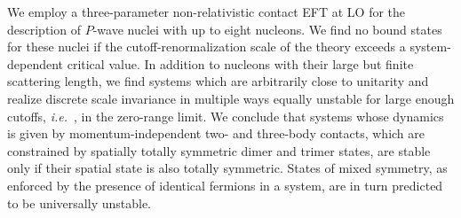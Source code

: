 \documentclass[preprint,12pt]{elsarticle}
\newcommand{\ie}{\textit{i.e.}~}
\begin{document}
We employ a three-parameter non-relativistic contact EFT at LO for the description of $P$-wave nuclei with up to eight nucleons.
We find no bound states for these nuclei if the cutoff-renormalization scale of the theory exceeds a system-dependent critical value.
In addition to nucleons with their large but finite scattering length, we find systems which are arbitrarily close to unitarity and realize
discrete scale invariance in multiple ways equally unstable for large enough cutoffs, \ie, in the zero-range limit.
We conclude that systems whose dynamics is given by momentum-independent two- and three-body contacts, which are
constrained by spatially totally symmetric dimer and trimer states, are stable only if their spatial state is also totally symmetric.
States of mixed symmetry, as enforced by the presence of identical fermions in a system, are in turn predicted to be universally unstable. 
\end{document}
